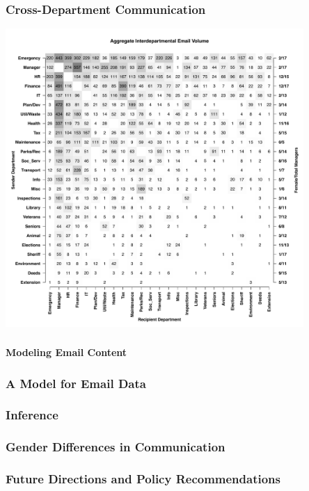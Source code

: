 \documentclass[xcolor={table}]{beamer}
\begin{document}
\begin{frame}\frametitle{Cross-Department Communication}
	\centering
	\includegraphics[width = 0.85\textwidth]{images/Aggregate_Email_Flows.pdf}
\end{frame}

\begin{frame}\frametitle{}
	\begin{center}
		\Huge\textbf{Modeling Email Content}
	\end{center}
\end{frame}


\begin{frame}\frametitle{A Model for Email Data}
	
\end{frame}

\begin{frame}\frametitle{Inference}
	
\end{frame}

\begin{frame}\frametitle{Gender Differences in Communication}
	
\end{frame}


\begin{frame}\frametitle{Future Directions and Policy Recommendations}
	
\end{frame}
\end{document}
